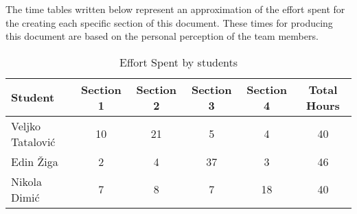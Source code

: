 The time tables written below represent an approximation of the effort spent for the
creating each specific section of this document. These times for producing this document are based on the personal perception of the team members.

\begin{table}[h!]
\centering
\begin{tabular}{|l|c|c|c|c|c|}
\hline
\textbf{Student} & \textbf{Section 1} & \textbf{Section 2} & \textbf{Section 3} & \textbf{Section 4} & \textbf{Total Hours} \\ \hline
Veljko Tatalović & 10 & 21 & 5 & 4 & 40 \\ \hline
Edin Žiga & 2 & 4 & 37 & 3 & 46\\ \hline
Nikola Dimić & 7 & 8 & 7 & 18 & 40 \\ \hline
\end{tabular}
\caption{Effort Spent by students}
\label{tab:effort_table}
\end{table}